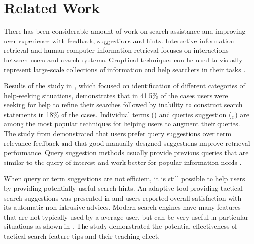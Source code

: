\documentclass{sig-alternate}
\begin{document}
\section{Related Work}



There has been considerable amount of work on search assistance and improving user experience with feedback, suggestions and hints. Interactive information retrieval and human-computer information retrieval \cite{marchionini2006toward} focuses on interactions between users and search systems. Graphical techniques can be used to visually represent large-scale collections of information and help searchers in their tasks \cite{card1999readings}.

Results of the study in \cite{xie2009understanding}, which focused on identification of different categories of help-seeking situations, demonstrates that in 41.5\% of the cases users were seeking for help to refine their searches followed by inability to construct search statements in 18\% of the cases. 
Individual terms (\cite{ruthven2003survey}) and queries suggestion (\cite{Jones:2006:GQS:1135777.1135835},\cite{Bhatia:2011:QSA:2009916.2010023},\cite{Cao:2008:CQS:1401890.1401995}) are among the most popular techniques for helping users to augment their queries.
The study from \cite{Kelly:2009:CQT:1571941.1572006} demonstrated that users prefer query suggestions over term relevance feedback and that good manually designed suggestions improve retrieval performance.
Query suggestion methods usually provide previous queries that are similar to the query of interest and work better for popular information needs \cite{Bhatia:2011:QSA:2009916.2010023}.

When query or term suggestions are not efficient, it is still possible to help users by providing potentially useful search hints. An adaptive tool providing tactical search suggestions was presented in \cite{Kriewel2007} and users reported overall satisfaction with its automatic non-intrusive advices. Modern search engines have many features that are not typically used by a average user, but can be very useful in particular situations as shown in \cite{Moraveji:2011:MIU:2009916.2009966}. The study demonstrated the potential effectiveness of tactical search feature tips and their teaching effect.
\end{document}
